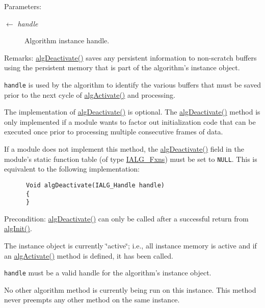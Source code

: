 \begin{Desc}
\item[Parameters:]
\begin{description}
\item[\mbox{$\leftarrow$} {\em handle}]Algorithm instance handle.\end{description}
\end{Desc}
\begin{Desc}
\item[Remarks:]\hyperlink{struct_i_a_l_g___fxns_10f29860ab8b3beab69b0f0128c3d969}{alg\-Deactivate()} saves any persistent information to non-scratch buffers using the persistent memory that is part of the algorithm's instance object.

{\tt handle} is used by the algorithm to identify the various buffers that must be saved prior to the next cycle of \hyperlink{struct_i_a_l_g___fxns_f1213efc8ac6fdfb72b50da9950baaa7}{alg\-Activate()} and processing.

The implementation of \hyperlink{struct_i_a_l_g___fxns_10f29860ab8b3beab69b0f0128c3d969}{alg\-Deactivate()} is optional. The \hyperlink{struct_i_a_l_g___fxns_10f29860ab8b3beab69b0f0128c3d969}{alg\-Deactivate()} method is only implemented if a module wants to factor out initialization code that can be executed once prior to processing multiple consecutive frames of data.

If a module does not implement this method, the \hyperlink{struct_i_a_l_g___fxns_10f29860ab8b3beab69b0f0128c3d969}{alg\-Deactivate()} field in the module's static function table (of type \hyperlink{struct_i_a_l_g___fxns}{IALG\_\-Fxns}) must be set to {\tt NULL}. This is equivalent to the following implementation: 

\begin{Code}\begin{verbatim}      Void algDeactivate(IALG_Handle handle)
      {
      }
\end{verbatim}\end{Code}

\end{Desc}
\begin{Desc}
\item[Precondition:]\hyperlink{struct_i_a_l_g___fxns_10f29860ab8b3beab69b0f0128c3d969}{alg\-Deactivate()} can only be called after a successful return from \hyperlink{struct_i_a_l_g___fxns_94eca7c58cceb112eccd970a6cf3f569}{alg\-Init()}.

The instance object is currently \char`\"{}active\char`\"{}; i.e., all instance memory is active and if an \hyperlink{struct_i_a_l_g___fxns_f1213efc8ac6fdfb72b50da9950baaa7}{alg\-Activate()} method is defined, it has been called.

{\tt handle} must be a valid handle for the algorithm's instance object.

No other algorithm method is currently being run on this instance. This method never preempts any other method on the same instance.\end{Desc}
